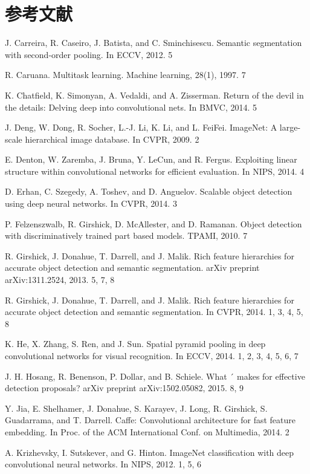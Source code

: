 \section{参考文献}
\par [1] J. Carreira, R. Caseiro, J. Batista, and C. Sminchisescu. Semantic segmentation with second-order pooling. In ECCV, 2012. 5
\par [2] R. Caruana. Multitask learning. Machine learning, 28(1), 1997. 7
\par [3] K. Chatfield, K. Simonyan, A. Vedaldi, and A. Zisserman. Return of the devil in the details: Delving deep into convolutional nets. In BMVC, 2014. 5
\par [4] J. Deng, W. Dong, R. Socher, L.-J. Li, K. Li, and L. FeiFei. ImageNet: A large-scale hierarchical image database. In CVPR, 2009. 2
\par [5] E. Denton, W. Zaremba, J. Bruna, Y. LeCun, and R. Fergus. Exploiting linear structure within convolutional networks for efficient evaluation. In NIPS, 2014. 4
\par [6] D. Erhan, C. Szegedy, A. Toshev, and D. Anguelov. Scalable object detection using deep neural networks. In CVPR, 2014. 3
\par [7] P. Felzenszwalb, R. Girshick, D. McAllester, and D. Ramanan. Object detection with discriminatively trained part based models. TPAMI, 2010. 7
\par [8] R. Girshick, J. Donahue, T. Darrell, and J. Malik. Rich feature hierarchies for accurate object detection and semantic segmentation. arXiv preprint arXiv:1311.2524, 2013. 5, 7, 8
\par [9] R. Girshick, J. Donahue, T. Darrell, and J. Malik. Rich feature hierarchies for accurate object detection and semantic segmentation. In CVPR, 2014. 1, 3, 4, 5, 8
\par [10] K. He, X. Zhang, S. Ren, and J. Sun. Spatial pyramid pooling in deep convolutional networks for visual recognition. In ECCV, 2014. 1, 2, 3, 4, 5, 6, 7
\par [11] J. H. Hosang, R. Benenson, P. Dollar, and B. Schiele. What ´ makes for effective detection proposals? arXiv preprint arXiv:1502.05082, 2015. 8, 9
\par [12] Y. Jia, E. Shelhamer, J. Donahue, S. Karayev, J. Long, R. Girshick, S. Guadarrama, and T. Darrell. Caffe: Convolutional architecture for fast feature embedding. In Proc. of the ACM International Conf. on Multimedia, 2014. 2
\par [13] A. Krizhevsky, I. Sutskever, and G. Hinton. ImageNet classification with deep convolutional neural networks. In NIPS, 2012. 1, 5, 6
